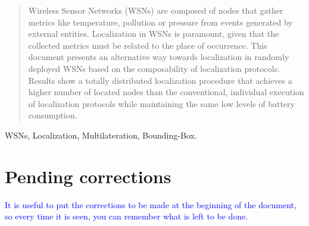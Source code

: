 \documentclass[conference]{IEEEtran}
\begin{document}
\begin{abstract}
\boldmath Wireless Sensor Networks (WSNs) are composed of nodes that gather metrics like temperature, pollution or pressure from events generated by external entities. Localization in WSNs is paramount, given that the collected metrics must be related to the place of occurrence. This document presents an alternative way towards localization in randomly deployed WSNs based on the composability of localization protocols. Results show a totally distributed localization procedure that achieves a higher number of located nodes than the conventional, individual execution of localization protocols while maintaining the same low levels of battery consumption.

% 

\end{abstract}

\begin{IEEEkeywords}
WSNs, Localization, Multilateration, Bounding-Box.
\end{IEEEkeywords}

\section{Pending corrections}
\textcolor{blue}{It is useful to put the corrections to be made at the beginning of the document, so every time it is seen, you can remember what is left to be done.}
\end{document}

